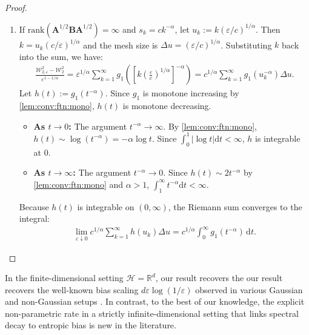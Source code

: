 \documentclass[noinfoline]{imsart}\setcounter{tocdepth}{2}
\renewcommand{\b}[1]{\mathbb{#1}}
\newcommand{\m}[1]{\mathbf{#1}}
\renewcommand{\c}[1]{\mathcal{#1}}
\newcommand{\rd}{\mathrm{d}}
\theoremstyle{plain}
\begin{document}
\begin{proof}
\begin{enumerate}[leftmargin = *]
\item If $\mathrm{rank} (\m{A}^{1/2} \m{B} \m{A}^{1/2}) = \infty$ and $s_k = c k^{-\alpha}$, let $u_k := k (\varepsilon/c)^{1/\alpha}$. Then $k = u_k (c/\varepsilon)^{1/\alpha}$ and the mesh size is $\Delta u = (\varepsilon/c)^{1/\alpha}$. 
Substituting $k$ back into the sum, we have:
\begin{align*}
    \frac{\c{W}_{2, \varepsilon}^2 - \c{W}_{2}^2}{\varepsilon^{1 - 1/\alpha}} 
    = \varepsilon^{1/\alpha} \sum_{k=1}^{\infty} g_{1} \left( \left[ k \left( \frac{\varepsilon}{c} \right)^{1/\alpha} \right]^{-\alpha} \right) = c^{1/\alpha} \sum_{k=1}^{\infty} g_{1}(u_k^{-\alpha})  \Delta u.
\end{align*}
Let $h(t) := g_1(t^{-\alpha})$. Since $g_1$ is monotone increasing by \cref{lem:conv:ftn:mono}, $h(t)$ is monotone decreasing. 
\begin{itemize}[leftmargin = *]
    \item \textbf{As $t \to 0$:} The argument $t^{-\alpha} \to \infty$. By \cref{lem:conv:ftn:mono}, $h(t) \sim \log(t^{-\alpha}) = -\alpha \log t$. Since $\int_0^1 |\log t| \rd t < \infty$, $h$ is integrable at 0.
    \item \textbf{As $t \to \infty$:} The argument $t^{-\alpha} \to 0$. Since $h(t) \sim 2 t^{-\alpha}$ by \cref{lem:conv:ftn:mono} and $\alpha > 1$, $\int_1^\infty t^{-\alpha} \rd t < \infty$.
\end{itemize}
Because $h(t)$ is integrable on $(0, \infty)$, the Riemann sum converges to the integral:
\begin{align*}
    \lim_{\varepsilon \downarrow 0} c^{1/\alpha} \sum_{k=1}^{\infty} h(u_k) \Delta u = c^{1/\alpha} \int_{0}^{\infty} g_{1}(t^{-\alpha}) \, \rd t.
\end{align*}
\end{enumerate}
\end{proof}

In the finite-dimensional setting $\c{H} = \b{R}^{d}$, our result recovers the our result recovers the well-known bias scaling $d \varepsilon \log (1/\varepsilon)$ observed in various Gaussian and non-Gaussian setups \cite{pal2019difference, carlier2023convergence, genevay2019sample, janati2020entropic}. In contrast, to the best of our knowledge, the explicit non-parametric rate in a strictly infinite-dimensional setting that links spectral decay to entropic bias is new in the literature.
\end{document}
